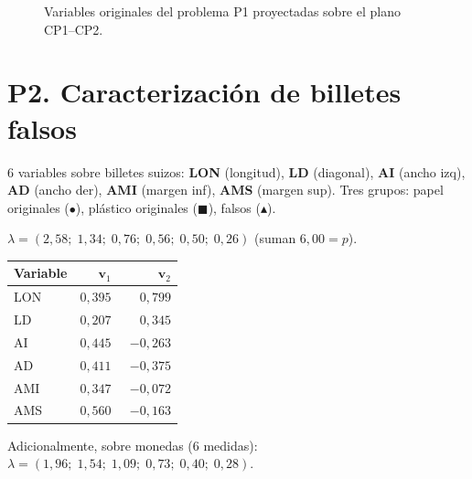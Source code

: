 \documentclass[11pt,a4paper]{article}
\newcommand{\arr}[4]{%
  \draw[-{Stealth[length=2mm]},thick,usachteal!80!black] (axis cs:0,0) -- (axis cs:#1,#2);%
  \node[anchor=#4,font=\small] at (axis cs:#1,#2) {\textbf{#3}};%
}
\begin{document}
\begin{figure}[H]
\centering
{}
\caption{Variables originales del problema P1 proyectadas sobre el plano CP1--CP2.}
\label{fig:p1var}
\end{figure}

\newpage
\section{P2. Caracterización de billetes falsos}

\begin{enuncbox}
6 variables sobre billetes suizos: \textbf{LON} (longitud), \textbf{LD} (diagonal), \textbf{AI} (ancho izq), \textbf{AD} (ancho der), \textbf{AMI} (margen inf), \textbf{AMS} (margen sup). Tres grupos: papel originales ($\bullet$), plástico originales ($\blacksquare$), falsos ($\blacktriangle$).

\smallskip
$\lambda=(2{,}58;\;1{,}34;\;0{,}76;\;0{,}56;\;0{,}50;\;0{,}26)$ \quad (suman $6{,}00=p$).

\begin{center}\small
\begin{tabular}{lrr}\toprule
Variable & $\bm v_1$ & $\bm v_2$ \\\midrule
LON & $0{,}395$ & $\phantom{-}0{,}799$\\
LD  & $0{,}207$ & $\phantom{-}0{,}345$\\
AI  & $0{,}445$ & $-0{,}263$\\
AD  & $0{,}411$ & $-0{,}375$\\
AMI & $0{,}347$ & $-0{,}072$\\
AMS & $0{,}560$ & $-0{,}163$\\\bottomrule
\end{tabular}
\end{center}

\smallskip
Adicionalmente, sobre monedas (6 medidas): $\lambda=(1{,}96;\;1{,}54;\;1{,}09;\;0{,}73;\;0{,}40;\;0{,}28)$.
\end{enuncbox}
\end{document}
